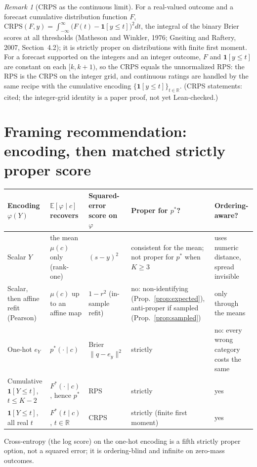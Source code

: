 \documentclass[11pt]{article}
\theoremstyle{remark}
\newtheorem{remark}{Remark}
\theoremstyle{definition}
\newcommand{\E}{\mathbb{E}}
\newcommand{\pstar}{p^{*}}
\newcommand{\onehot}{e}
\newcommand{\1}{\mathbf{1}}
\begin{document}
\begin{remark}[CRPS as the continuous limit]
For a real-valued outcome and a forecast cumulative distribution function $F$, $\mathrm{CRPS}(F,y)=\int_{-\infty}^{\infty}\bigl(F(t)-\1[y\le t]\bigr)^{2}dt$, the integral of the binary Brier scores at all thresholds (Matheson and Winkler, 1976; Gneiting and Raftery, 2007, Section~4.2); it is strictly proper on distributions with finite first moment. For a forecast supported on the integers and an integer outcome, $F$ and $\1[y\le t]$ are constant on each $[k,k+1)$, so the CRPS equals the unnormalized RPS: the RPS is the CRPS on the integer grid, and continuous ratings are handled by the same recipe with the cumulative encoding $\{\1[y\le t]\}_{t\in\mathbb{R}}$. (CRPS statements: cited; the integer-grid identity is a paper proof, not yet Lean-checked.)
\end{remark}

\section{Framing recommendation: encoding, then matched strictly proper score}
\label{sec:framing}

\begin{center}
\small
\begin{tabular}{P{2.9cm}P{3.0cm}P{3.1cm}P{3.0cm}P{2.4cm}}
\toprule
Encoding $\varphi(Y)$ & $\E[\varphi\mid c]$ recovers & Squared-error score on $\varphi$ & Proper for $\pstar$? & Ordering-aware? \\
\midrule
Scalar $Y$ & the mean $\mu(c)$ only (rank-one) & $(s-y)^{2}$ & consistent for the mean; not proper for $\pstar$ when $K\ge3$ & uses numeric distance, spread invisible \\
Scalar, then affine refit (Pearson) & $\mu(c)$ up to an affine map & $1-r^{2}$ (in-sample refit) & no: non-identifying (Prop.~\ref{prop:expected}), anti-proper if sampled (Prop.~\ref{prop:sampled}) & only through the means \\
One-hot $\onehot_Y$ & $\pstar(\cdot\mid c)$ & Brier $\|q-\onehot_y\|^{2}$ & strictly & no: every wrong category costs the same \\
Cumulative $\1[Y\le t]$, $t\le K-2$ & $F^{*}(\cdot\mid c)$, hence $\pstar$ & RPS & strictly & yes \\
$\1[Y\le t]$, all real $t$ & $F^{*}(t\mid c)$, $t\in\mathbb{R}$ & CRPS & strictly (finite first moment) & yes \\
\bottomrule
\end{tabular}
\end{center}
Cross-entropy (the log score) on the one-hot encoding is a fifth strictly proper option, not a squared error; it is ordering-blind and infinite on zero-mass outcomes.
\end{document}

